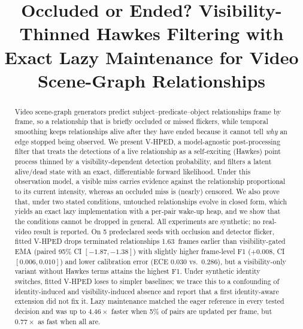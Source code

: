 \documentclass[conference]{IEEEtran}
\begin{document}
\title{Occluded or Ended? Visibility-Thinned Hawkes Filtering with Exact Lazy Maintenance for Video Scene-Graph Relationships}

\author{\IEEEauthorblockN{\textcolor{red}{[Author Name 1]}}
\IEEEauthorblockA{\textcolor{red}{[Department, Institution]}\\
\textcolor{red}{[City, Country]}\\
\textcolor{red}{[email]}}
\and
\IEEEauthorblockN{\textcolor{red}{[Author Name 2]}}
\IEEEauthorblockA{\textcolor{red}{[Department, Institution]}\\
\textcolor{red}{[City, Country]}\\
\textcolor{red}{[email]}}}

\maketitle

\begin{abstract}
Video scene-graph generators predict subject--predicate--object relationships frame by
frame, so a relationship that is briefly occluded or missed flickers, while temporal
smoothing keeps relationships alive after they have ended because it cannot tell
\emph{why} an edge stopped being observed. We present V-HPED, a model-agnostic
post-processing filter that treats the detections of a live relationship as a
self-exciting (Hawkes) point process thinned by a visibility-dependent detection
probability, and filters a latent alive/dead state with an exact, differentiable
forward likelihood. Under this observation model, a visible miss carries evidence
against the relationship proportional to its current intensity, whereas an occluded
miss is (nearly) censored. We also prove that, under two stated conditions, untouched
relationships evolve in closed form, which yields an exact lazy implementation with a
per-pair wake-up heap, and we show that the conditions cannot be dropped in general.
All experiments are synthetic; no real-video result is reported. On 5 predeclared
seeds with occlusion and detector flicker, fitted V-HPED drops terminated relationships
1.63~frames earlier than visibility-gated EMA (paired 95\% CI $[-1.87,-1.38]$) with
slightly higher frame-level F1 ($+0.008$, CI $[0.006,0.010]$) and lower calibration
error (ECE $0.030$ vs.\ $0.286$), but a visibility-only variant without Hawkes terms
attains the highest F1. Under synthetic identity switches, fitted V-HPED loses to
simpler baselines; we trace this to a confounding of identity-induced and
visibility-induced absence and report that a first identity-aware extension did not
fix it. Lazy maintenance matched the eager reference in every tested decision and was
up to $4.46\times$ faster when 5\% of pairs are updated per frame, but $0.77\times$ as
fast when all are.
\end{abstract}
\end{document}
